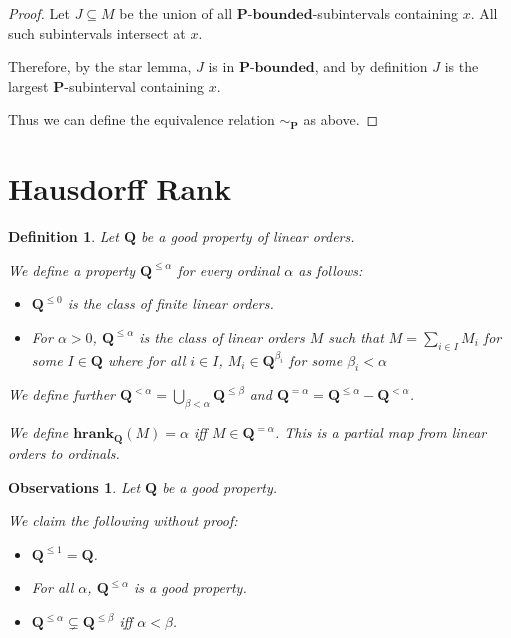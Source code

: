 \documentclass{article}
\newtheorem{observations}{Observations}
\newtheorem{definition}{Definition}
\newcommand{\hrank}[1]{\mathbf{hrank}_{\qq}\left( #1 \right)}
\newcommand{\bounded}[1]{{#1} \text{-} \mathbf{bounded}}
\newcommand{\pp}{\mathbf{P}}
\newcommand{\qq}{\mathbf{Q}}
\begin{document}
\begin{proof}
  Let $J \subseteq M$ be the union of all $\bounded{\pp}$-subintervals containing $x$.
  All such subintervals intersect at $x$.

  Therefore, by the star lemma, $J$ is in $\bounded{\pp}$, and by definition
  $J$ is the largest $\pp$-subinterval containing $x$.

  Thus we can define the equivalence relation $\sim_{\pp}$ as above.
\end{proof}

\section{Hausdorff Rank}

\begin{definition}
  Let $\qq$ be a good property of linear orders.

  We define a property $\qq^{\le \alpha}$
  for every ordinal $\alpha$ as follows:

  \begin{itemize}
    \item $\qq^{\le 0}$ is the class of finite linear orders.
    \item For $\alpha > 0$, $\qq^{\le \alpha}$ is the class of linear orders $M$ such that
          $M = \sum_{i \in I} M_i$ for some $I \in \qq$ where
          for all $i \in I$, $M_i \in \qq^{\beta_i}$ for some $\beta_i < \alpha$
  \end{itemize}

  We define further $\qq^{< \alpha} = \bigcup_{\beta < \alpha} \qq^{\le \beta}$
  and $\qq^{=\alpha} = \qq^{\le \alpha} - \qq^{< \alpha}$.

  We define $\hrank{M} = \alpha$ iff $M \in \qq^{= \alpha}$.
  This is a \emph{partial map} from linear orders to ordinals.
\end{definition}

\begin{observations}
  Let $\qq$ be a good property.

  We claim the following without proof:

  \begin{itemize}
    \item $\qq^{\le 1} = \qq$.
    \item For all $\alpha$, $\qq^{\le \alpha}$ is a good property.
    \item $\qq^{\le \alpha} \subsetneq \qq^{\le \beta}$ iff $\alpha < \beta$.
  \end{itemize}
\end{observations}
\end{document}
